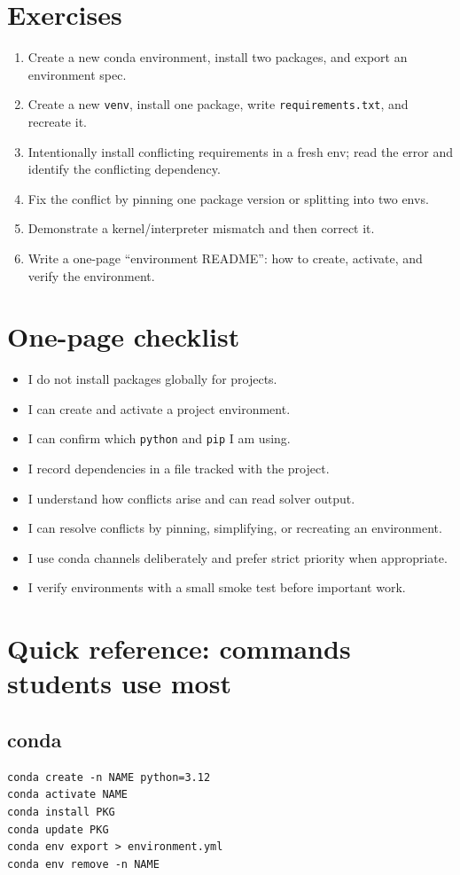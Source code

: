\section{Exercises}
\begin{enumerate}
\item Create a new conda environment, install two packages, and export an environment spec.
\item Create a new \texttt{venv}, install one package, write \texttt{requirements.txt}, and recreate it.
\item Intentionally install conflicting requirements in a fresh env; read the error and identify the conflicting dependency.
\item Fix the conflict by pinning one package version or splitting into two envs.
\item Demonstrate a kernel/interpreter mismatch and then correct it.
\item Write a one-page ``environment README'': how to create, activate, and verify the environment.
\end{enumerate}

\section{One-page checklist}
\begin{itemize}
\item I do not install packages globally for projects.
\item I can create and activate a project environment.
\item I can confirm which \texttt{python} and \texttt{pip} I am using.
\item I record dependencies in a file tracked with the project.
\item I understand how conflicts arise and can read solver output.
\item I can resolve conflicts by pinning, simplifying, or recreating an environment.
\item I use conda channels deliberately and prefer strict priority when appropriate.
\item I verify environments with a small smoke test before important work.
\end{itemize}

\section{Quick reference: commands students use most}
\subsection{conda}
\begin{verbatim}
conda create -n NAME python=3.12
conda activate NAME
conda install PKG
conda update PKG
conda env export > environment.yml
conda env remove -n NAME
\end{verbatim}

